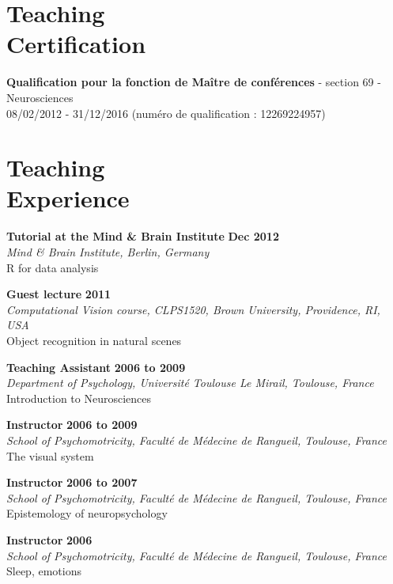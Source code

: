 \documentclass[margin,line]{resume}
\begin{document}
\begin{resume}
\vspace{3mm}

    \section{\mysidestyle Teaching\\Certification}
    \textbf{Qualification pour la fonction de Maître de conférences} - section 69 - Neurosciences\\
    08/02/2012 - 31/12/2016 (numéro de qualification : 12269224957)
       
\vspace{3mm}

    \section{\mysidestyle Teaching\\Experience}
    
    \textbf{Tutorial at the Mind \& Brain Institute} \hfill \textbf{Dec 2012}\\
	\textsl{Mind \& Brain Institute, Berlin, Germany}\\
	R for data analysis

	\textbf{Guest lecture} \hfill \textbf{2011}\\
	\textsl{Computational Vision course, CLPS1520, Brown University, Providence, RI, USA}\\
	Object recognition in natural scenes

	\textbf{Teaching Assistant} \hfill \textbf{2006 to 2009}\\
	\textsl{Department of Psychology, Université Toulouse Le Mirail, Toulouse, France}\\
	Introduction to Neurosciences

	\textbf{Instructor} \hfill \textbf{2006 to 2009}\\
	\textsl{School of Psychomotricity, Faculté de Médecine de Rangueil, Toulouse, France}\\
	The visual system 

	\textbf{Instructor} \hfill \textbf{2006 to 2007}\\
	\textsl{School of Psychomotricity, Faculté de Médecine de Rangueil, Toulouse, France}\\
	Epistemology of neuropsychology

	\textbf{Instructor} \hfill \textbf{2006}\\
	\textsl{School of Psychomotricity, Faculté de Médecine de Rangueil, Toulouse, France}\\
	Sleep, emotions



\end{resume}
\end{document}
